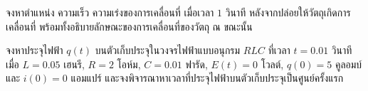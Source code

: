 \documentclass[12pt,final]{novelette} %
\begin{document}
\begin{question}[resume]
\begin{question}
        \item
        จงหาตำแหน่ง ความเร็ว ความเร่งของการเคลื่อนที่ เมื่อเวลา $1$ วินาที หลังจากปล่อยให้วัตถุเกิดการเคลื่อนที่
        พร้อมทั้งอธิบายลักษณะของการเคลื่อนที่ของวัตถุ ณ ขณะนั้น 


    \end{question}

    \item {}
    จงหาประจุไฟฟ้า $q(t)$ บนตัวเก็บประจุในวงจรไฟฟ้าแบบอนุกรม $RLC$ ที่เวลา $t = 0.01$ วินาที \\
    เมื่อ $L = 0.05$ เฮนรี, $R = 2$ โอห์ม, $C = 0.01$ ฟารัด, $E(t) = 0$ โวลต์, $q(0) = 5$ คูลอมบ์ และ $i(0) = 0$ แอมแปร์
    และจงพิจารณาหาเวลาที่ประจุไฟฟ้าบนตัวเก็บประจุเป็นศูนย์ครั้งแรก 


\end{question}
\end{document}
